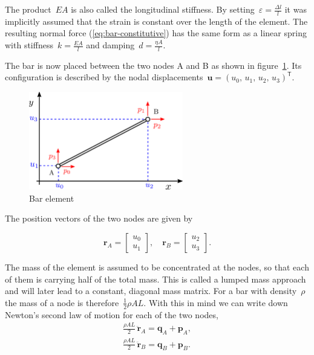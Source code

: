 The product~$EA$ is also called the longitudinal stiffness.
By setting~$\varepsilon = \frac{\Delta l}{l}$ it was implicitly assumed that the strain is constant over the length of the element.
The resulting normal force (\ref{eq:bar-constitutive}) has the same form as a linear spring with stiffness~$k = \frac{EA}{l}$ and damping~$d = \frac{\eta A}{l}$.

The bar is now placed between the two nodes A and B as shown in figure~\ref{fig:bar-element-2}. Its configuration is described by the nodal displacements~$\boldsymbol{u} = (u_0,\,u_1,\,u_2,\,u_3)^\mathsf{T}$.

\begin{figure}[h]
\centering
\includegraphics[width=0.6\textwidth]{figures/elements/bar-element-2}
\caption{Bar element}
\label{fig:bar-element-2}
\end{figure}

The position vectors of the two nodes are given by

\begin{equation}
\boldsymbol{r}_A =
\begin{bmatrix} u_0 \\ u_1 \end{bmatrix}, \quad
\boldsymbol{r}_B =
\begin{bmatrix} u_2 \\ u_3 \end{bmatrix}.\label{bar:node-positions}
\end{equation}

The mass of the element is assumed to be concentrated at the nodes, so that each of them is carrying half of the total mass.
This is called a lumped mass approach and will later lead to a constant, diagonal mass matrix.
For a bar with density~$\rho$ the mass of a node is therefore~$\frac{1}{2}\rho A L$. With this in mind we can write down Newton's second law of motion for each of the two nodes,
%
\begin{align}
\frac{\rho A L}{2}\,\ddot{\boldsymbol{r}}_A = \boldsymbol{q}_A + \boldsymbol{p}_A,\label{eq:bar-newton-1}\\
\frac{\rho A L}{2}\,\ddot{\boldsymbol{r}}_B = \boldsymbol{q}_B + \boldsymbol{p}_B.\label{eq:bar-newton-2}
\end{align}

